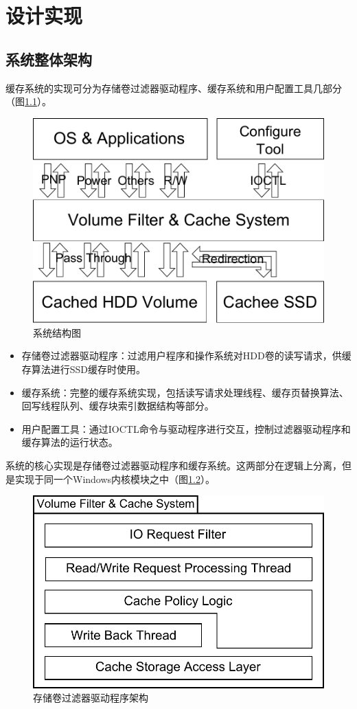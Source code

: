 
\chapter{设计实现}
\label{cha:mainmatter}

\section{系统整体架构}
\label{sec:system_overview}

缓存系统的实现可分为存储卷过滤器驱动程序、缓存系统和用户配置工具几部分（图\ref{fig:sys-overview}）。

\begin{figure}[H]
\centering
\includegraphics[width=0.6\linewidth]{./graph/sys-overview}
\caption{系统结构图}
\label{fig:sys-overview}
\end{figure}

\begin{itemize}
\item
存储卷过滤器驱动程序：过滤用户程序和操作系统对HDD卷的读写请求，供缓存算法进行SSD缓存时使用。
\item
缓存系统：完整的缓存系统实现，包括读写请求处理线程、缓存页替换算法、回写线程队列、缓存块索引数据结构等部分。
\item
用户配置工具：通过IOCTL命令与驱动程序进行交互，控制过滤器驱动程序和缓存算法的运行状态。
\end{itemize}

系统的核心实现是存储卷过滤器驱动程序和缓存系统。这两部分在逻辑上分离，但是实现于同一个Windows内核模块之中（图\ref{fig:sys-flt-arch}）。

\begin{figure}[H]
\centering
\includegraphics[width=0.6\linewidth]{./graph/sys-flt-arch}
\caption{存储卷过滤器驱动程序架构}
\label{fig:sys-flt-arch}
\end{figure}

